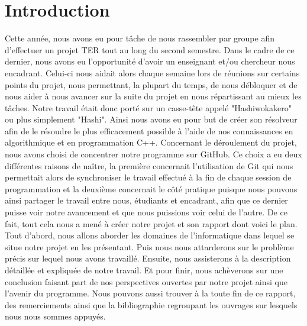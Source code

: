 \chapter*{Introduction}
\label{chap:introduction}

Cette année, nous avons eu pour tâche de nous rassembler par groupe afin d'effectuer un projet TER tout au long du second semestre. Dans le cadre de ce dernier, nous avons eu l'opportunité d'avoir un enseignant et/ou chercheur nous encadrant. Celui-ci nous aidait alors chaque semaine lors de réunions sur certains points du projet, nous permettant, la plupart du temps, de nous débloquer et de nous aider à nous avancer sur la suite du projet en nous répartissant au mieux les tâches. \newline
Notre travail était donc porté sur un casse-tête appelé "Hashiwokakero" ou plus simplement "Hashi". Ainsi nous avons eu pour but de créer son résolveur afin de le résoudre le plus efficacement possible à l'aide de nos connaissances en algorithmique et en programmation C++. \newline
Concernant le déroulement du projet, nous avons choisi de concentrer notre programme sur GitHub. Ce choix a eu deux différentes raisons de naître, la première concernait l'utilisation de Git qui nous permettait alors de synchroniser le travail effectué à la fin de chaque session de programmation et la deuxième concernait le côté pratique puisque nous pouvons ainsi partager le travail entre nous, étudiants et encadrant, afin que ce dernier puisse voir notre avancement et que nous puissions voir celui de l'autre. \newline
De ce fait, tout cela nous a mené à créer notre projet et son rapport dont voici le plan. \newline
Tout d'abord, nous allons aborder les domaines de l'informatique dans lequel se situe notre projet en les présentant. Puis nous nous attarderons sur le problème précis sur lequel nous avons travaillé. Ensuite, nous assisterons à la description détaillée et expliquée de notre travail. Et pour finir, nous achèverons sur une conclusion faisant part de nos perspectives ouvertes par notre projet ainsi que l'avenir du programme. Nous pouvons aussi trouver à la toute fin de ce rapport, des remerciements ainsi que la bibliographie regroupant les ouvrages sur lesquels nous nous sommes appuyés.